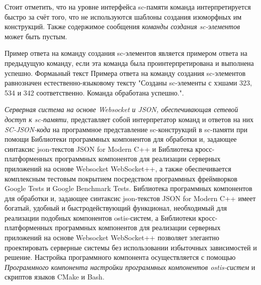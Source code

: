 \begin{scnitemize}
Стоит отметить, что на уровне интерфейса sc-памяти команда интерпретируется быстро за счёт того, что не используются
шаблоны создания изоморфных им конструкций. Также содержимое сообщения \textit{команды создания sc-элементов} может
быть пустым.

\begin{scnindent}
\end{scnindent}

Пример ответа на команду создания sc-элементов является примером ответа на предыдущую команду, если эта команда была
проинтерпретирована и выполнена успешно. Формаьный текст Примера ответа на команду создания sc-элементов равнозначен
естественно-языковому тексту "Созданы sc-элементы с хэшами 323, 534 и 342 соответственно. Команда обработана успешно.".

\textit{Серверная система на основе Websocket и JSON, обеспечивающая сетевой доступ к sc-памяти}, представляет собой
интерпретатор команд и ответов на них \textit{SC-JSON-кода} на программное представление sc-конструкций в sc-памяти при
помощи Библиотеки программных компонентов для обработки и, задающее синтаксис json-текстов JSON for Modern C++ и
Библиотека кросс-платформенных программных компонентов для реализации серверных приложений на основе Websocket WebSocket++,
а также обеспечивается комплексным тестовым покрытием посредством программных фреймворков Google Tests и Google Benchmark Tests.
Библиотека программных компонентов для обработки и, задающее синтаксис json-текстов JSON for Modern C++ имеет богатый,
удобный и быстродействующий функционал, необходимый для реализации подобных компонентов ostis-систем, а Библиотеки
кросс-платформенных программных компонентов для реализации серверных приложений на основе Websocket WebSocket++
позволяет элегантно проектировать серверные системы без использовании избыточных зависимостей и решение. Настройка
программного компонента осуществляется с помощью \textit{Программного компонента настройки программных компонентов
ostis-систем} и скриптов языков CMake и Bash.


\end{scnitemize}
